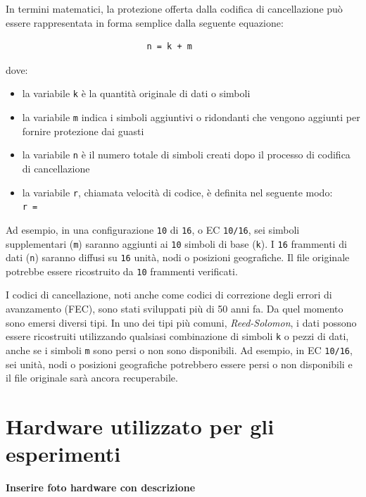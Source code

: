 In termini matematici, la protezione offerta dalla codifica di cancellazione pu\`{o} essere rappresentata in forma semplice dalla seguente equazione:  
\begin{verbatim}
                       		n = k + m
\end{verbatim}
dove:
\begin{itemize}
\item 
la variabile \verb"k" \`{e} la quantit\`{a} originale di dati o simboli 
\item
la variabile \verb"m" indica i simboli aggiuntivi o ridondanti che vengono aggiunti per fornire protezione dai guasti
\item
la variabile \verb"n" \`{e} il numero totale di simboli creati dopo il processo di codifica di cancellazione\cite{etichetta11}
\item
la variabile \verb"r", chiamata velocit\`{a} di codice, \`{e} definita nel seguente modo: \\

						\verb"r = "
                       		
\end{itemize}

Ad esempio, in una configurazione \verb"10" di \verb"16", o EC \verb"10/16", sei simboli supplementari (\verb"m") saranno aggiunti ai \verb"10" simboli di base (\verb"k"). I \verb"16" frammenti di dati (\verb"n") saranno diffusi su \verb"16" unit\`{a}, nodi o posizioni geografiche. Il file originale potrebbe essere ricostruito da \verb"10" frammenti verificati.\cite{etichetta11}

I codici di cancellazione, noti anche come codici di correzione degli errori di avanzamento (FEC), sono stati sviluppati pi\`{u} di 50 anni fa. Da quel momento sono emersi diversi tipi. In uno dei tipi pi\`{u} comuni, \textit{Reed-Solomon}, i dati possono essere ricostruiti utilizzando qualsiasi combinazione di simboli \verb"k" o pezzi di dati, anche se i simboli \verb"m" sono persi o non sono disponibili. Ad esempio, in EC \verb"10/16", sei unit\`{a}, nodi o posizioni geografiche potrebbero essere persi o non disponibili e il file originale sar\`{a} ancora recuperabile.\cite{etichetta11}
 
\item
\section{Hardware utilizzato per gli esperimenti}
\textbf{Inserire foto hardware con descrizione}
\item
